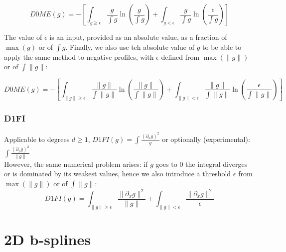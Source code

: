 \documentclass[paper=a4, fontsize=11pt]{scrartcl}
\numberwithin{equation}{section}		%
\numberwithin{figure}{section}			%
\numberwithin{table}{section}				%
\begin{document}
$$
D0ME\left(g\right) = - \left[\int_{g\geq \epsilon} \frac{g}{\int g}\ln\left(\frac{g}{\int g}\right) + \int_{g<\epsilon} \frac{g}{\int g}\ln\left(\frac{\epsilon}{\int g}\right) \right]
$$

The value of $\epsilon$ is an input, provided as an absolute value, as a fraction of $\max(g)$ or of $\int g$.
Finally, we also use teh absolute value of $g$ to be able to apply the same method to negative profiles, with $\epsilon$ defined from $\max(\|g\|)$ or of $\int \|g\|$:

$$
D0ME\left(g\right) = - \left[\int_{\|g\|\geq \epsilon} \frac{\|g\|}{\int \|g\|}\ln\left(\frac{\|g\|}{\int \|g\|}\right) + \int_{\|g\|<\epsilon} \frac{\|g\|}{\int \|g\|}\ln\left(\frac{\epsilon}{\int \|g\|}\right) \right]
$$


\subsubsection{D1FI}

Applicable to degrees $d \geq 1$, $D1FI\left(g\right) = \int \frac{\left(\partial_x g\right)^2}{g}$ or optionally (experimental): $\int \frac{\left(\partial_x g\right)^2}{\|g\|}$\\
However, the same numerical problem arises: if $g$ goes to $0$ the integral diverges or is dominated by its weakest values, hence we also introduce a threshold $\epsilon$ from $\max(\|g\|)$ or of $\int \|g\|$:
$$
D1FI\left(g\right) = \int_{\|g\|\geq \epsilon} \frac{\|\partial_x g\|^2}{\|g\|} + \int_{\|g\|<\epsilon} \frac{\|\partial_x g\|^2}{\epsilon}
$$




\newpage
\section{2D b-splines}
\end{document}

